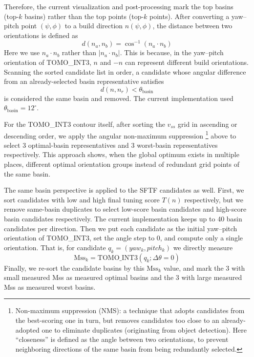 \documentclass[11pt,a4paper]{article}
\begin{document}
Therefore, the current visualization and post-processing mark the top basins (top-$k$ basins) rather than the top points (top-$k$ points).
After converting a yaw--pitch point $(\psi,\phi)$ to a build direction $n(\psi,\phi)$,
the distance between two orientations is defined as
\begin{equation}
d(n_a,n_b)
=
\cos^{-1}(n_a\cdot n_b)
\end{equation}
Here we use $n_a\cdot n_b$ rather than $|n_a\cdot n_b|$.
This is because, in the yaw--pitch orientation of TOMO\_INT3, $n$ and $-n$ can represent different build orientations.
Scanning the sorted candidate list in order,
a candidate whose angular difference from an already-selected basin representative satisfies
\begin{equation}
d(n,n_r) < \theta_{\mathrm{basin}}
\end{equation}
is considered the same basin and removed.
The current implementation used $\theta_{\mathrm{basin}}=12^\circ$.

For the TOMO\_INT3 contour itself, after sorting the $v_{ss}$ grid in ascending or descending order,
we apply the angular non-maximum suppression%
\footnote{Non-maximum suppression (NMS): a technique that adopts candidates from the best-scoring one in turn, but removes candidates
too close to an already-adopted one to eliminate duplicates (originating from object detection). Here ``closeness'' is defined as the angle
between two orientations, to prevent neighboring directions of the same basin from being redundantly selected.}
above to select 3 optimal-basin representatives and 3 worst-basin representatives respectively.
This approach shows, when the global optimum exists in multiple places,
different optimal orientation groups instead of redundant grid points of the same basin.

The same basin perspective is applied to the SFTF candidates as well.
First, we sort candidates with low and high final tuning score $T(n)$ respectively, but
we remove same-basin duplicates to select low-score basin candidates and high-score basin candidates respectively.
The current implementation keeps up to 40 basin candidates per direction.
Then we put each candidate as the initial yaw--pitch orientation of TOMO\_INT3,
set the angle step to 0, and compute only a single orientation.
That is, for candidate $q_k=(yaw_k,pitch_k)$ we directly measure
\begin{equation}
\mathrm{Mss}_k
=
\mathrm{TOMO\_INT3}(q_k;\Delta\theta=0)
\end{equation}
Finally, we re-sort the candidate basins by this $\mathrm{Mss}_k$ value,
and mark the 3 with small measured Mss as measured optimal basins
and the 3 with large measured Mss as measured worst basins.
\end{document}
